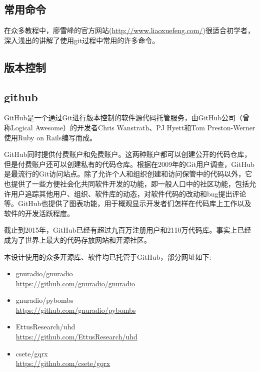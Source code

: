 		\subsection{常用命令}
			\par 在众多教程中，廖雪峰的官方网站(\href{http://www.liaoxuefeng.com/}{http://www.liaoxuefeng.com/})很适合初学者，深入浅出的讲解了使用git过程中常用的许多命令。
		\subsection{版本控制}
		\subsection{github}
			\par GitHub是一个通过Git进行版本控制的软件源代码托管服务，由GitHub公司（曾称Logical Awesome）的开发者Chris Wanstrath、PJ Hyett和Tom Preston-Werner使用Ruby on Rails编写而成。
			\par GitHub同时提供付费账户和免费账户。这两种账户都可以创建公开的代码仓库，但是付费账户还可以创建私有的代码仓库。根据在2009年的Git用户调查，GitHub是最流行的Git访问站点。除了允许个人和组织创建和访问保管中的代码以外，它也提供了一些方便社会化共同软件开发的功能，即一般人口中的社区功能，包括允许用户追踪其他用户、组织、软件库的动态，对软件代码的改动和bug提出评论等。GitHub也提供了图表功能，用于概观显示开发者们怎样在代码库上工作以及软件的开发活跃程度。
			\par 截止到2015年，GitHub已经有超过九百万注册用户和2110万代码库。事实上已经成为了世界上最大的代码存放网站和开源社区。\cite{ wiki:GitHub}
			\par 本设计使用的众多开源库、软件均已托管于GitHub，部分网址如下:
			\begin{itemize}
				\item gnuradio/gnuradio\\\href{https://github.com/gnuradio/gnuradio}{https://github.com/gnuradio/gnuradio}
				\item gnuradio/pybombs\\\href{https://github.com/gnuradio/pybombs}{https://github.com/gnuradio/pybombs}
				\item EttusResearch/uhd\\\href{https://github.com/EttusResearch/uhd}{https://github.com/EttusResearch/uhd}
				\item csete/gqrx\\\href{https://github.com/csete/gqrx}{https://github.com/csete/gqrx}
			\end{itemize}
